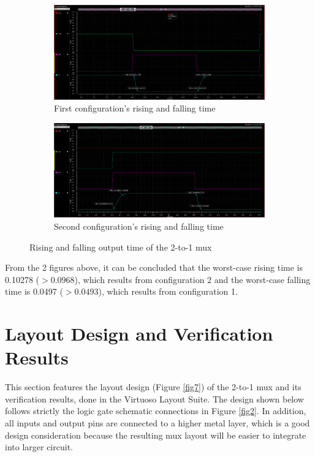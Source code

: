 \documentclass[letterpaper, 11pt]{article}
\begin{document}
\begin{figure}[htb!]
	\centering
	\begin{subfigure}[htb]{.9\linewidth}
		\includegraphics[width=\textwidth]{mux_rise_fall_time_1.png}
		\caption{First configuration's rising and falling time}
		\label{fig6a}
	\end{subfigure}
	\begin{subfigure}[htb]{.9\linewidth}
		\includegraphics[width=\textwidth]{mux_rise_fall_time_2.png}
		\caption{Second configuration's rising and falling time}
		\label{fig6b}
	\end{subfigure}
	\caption{Rising and falling output time of the 2-to-1 mux}
\end{figure}

\pagebreak
From the 2 figures above, it can be concluded that the worst-case rising time is 0.10278 ($>0.0968$), which results from configuration 2 and the worst-case falling time is 0.0497 ($>0.0493$), which results from configuration 1.


\pagebreak
\section{Layout Design and Verification Results}
\label{sec:layout_desg_and_verification}

This section features the layout design (Figure \ref{fig7}) of the 2-to-1 mux and its verification results, done in the Virtuoso Layout Suite. The design shown below follows strictly the logic gate schematic connections in Figure \ref{fig2}. In addition, all inputs and output pins are connected to a higher metal layer, which is a good design consideration because the resulting mux layout will be easier to integrate into larger circuit.
\end{document}
